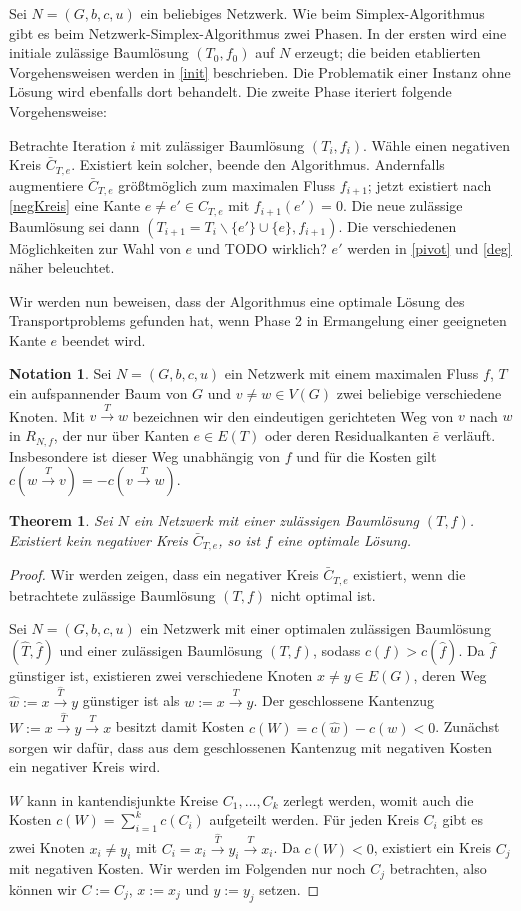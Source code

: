 \documentclass[a4paper,twoside,ngerman]{report}
\theoremstyle{plain}
\newtheorem{thm}{Theorem}
\theoremstyle{definition}
\newtheorem*{nota}{Notation}
\begin{document}
Sei $N=(G,b,c,u)$ ein beliebiges Netzwerk. Wie beim Simplex-Algorithmus gibt es beim Netzwerk-Simplex-Algorithmus zwei Phasen. In der ersten wird eine initiale zulässige Baumlösung $(T_0,f_0)$ auf $N$ erzeugt; die beiden etablierten Vorgehensweisen werden in \cref{init} beschrieben. Die Problematik einer Instanz ohne Lösung wird ebenfalls dort behandelt. Die zweite Phase iteriert folgende Vorgehensweise:

Betrachte Iteration $i$ mit zulässiger Baumlösung $(T_i,f_i)$. Wähle einen negativen Kreis $\bar{C}_{T,e}$. Existiert kein solcher, beende den Algorithmus. Andernfalls augmentiere $\bar{C}_{T,e}$ größtmöglich zum maximalen Fluss $f_{i+1}$; jetzt existiert nach \cref{negKreis} eine Kante $e\neq e'\in C_{T,e}$ mit $f_{i+1}(e')=0$. Die neue zulässige Baumlösung sei dann $(T_{i+1}=T_i\backslash\{e'\}\cup\{e\},f_{i+1})$. Die verschiedenen Möglichkeiten zur Wahl von $e$ und TODO wirklich? $e'$ werden in \cref{pivot} und \cref{deg} näher beleuchtet.

Wir werden nun beweisen, dass der Algorithmus eine optimale Lösung des Transportproblems gefunden hat, wenn Phase 2 in Ermangelung einer geeigneten Kante $e$ beendet wird.
\begin{nota}Sei $N=(G,b,c,u)$ ein Netzwerk mit einem maximalen Fluss $f$, $T$ ein aufspannender Baum von $G$ und $v\neq w\in V(G)$ zwei beliebige verschiedene Knoten. Mit $v\xrightarrow{T}w$ bezeichnen wir den eindeutigen gerichteten Weg von $v$ nach $w$ in $R_{N,f}$, der nur über Kanten $e\in E(T)$ oder deren Residualkanten $\bar{e}$ verläuft. Insbesondere ist dieser Weg unabhängig von $f$ und für die Kosten gilt $c(w\xrightarrow{T}v) = -c(v\xrightarrow{T}w)$.\end{nota}
\begin{thm}Sei $N$ ein Netzwerk mit einer zulässigen Baumlösung $(T,f)$. Existiert kein negativer Kreis $\bar{C}_{T,e}$, so ist $f$ eine optimale Lösung.\end{thm}
\begin{proof}Wir werden zeigen, dass ein negativer Kreis $\bar{C}_{T,e}$ existiert, wenn die betrachtete zulässige Baumlösung $(T,f)$ nicht optimal ist.
	
Sei $N=(G,b,c,u)$ ein Netzwerk mit einer optimalen zulässigen Baumlösung $(\hat{T},\hat{f})$ und einer zulässigen Baumlösung $(T,f)$, sodass $c(f)>c(\hat{f})$. Da $\hat{f}$ günstiger ist, existieren zwei verschiedene Knoten $x\neq y\in E(G)$, deren Weg $\hat{w}:=x\xrightarrow{\hat{T}}y$ günstiger ist als $w:=x\xrightarrow{T}y$. Der geschlossene Kantenzug $W:=x\xrightarrow{\hat{T}}y\xrightarrow{T}x$ besitzt damit Kosten $c(W)=c(\hat{w})-c(w)<0$. Zunächst sorgen wir dafür, dass aus dem geschlossenen Kantenzug mit negativen Kosten ein negativer Kreis wird.

$W$ kann in kantendisjunkte Kreise $C_1,\ldots,C_k$ zerlegt werden, womit auch die Kosten $c(W)=\sum_{i=1}^{k}c(C_i)$ aufgeteilt werden. Für jeden Kreis $C_i$ gibt es zwei Knoten $x_i\neq y_i$ mit $C_i=x_i\xrightarrow{\hat{T}}y_i\xrightarrow{T}x_i$. Da $c(W)<0$, existiert ein Kreis $C_j$ mit negativen Kosten. Wir werden im Folgenden nur noch $C_j$ betrachten, also können wir $C:=C_j$, $x:=x_j$ und $y:=y_j$ setzen.


\end{proof}
\end{document}

